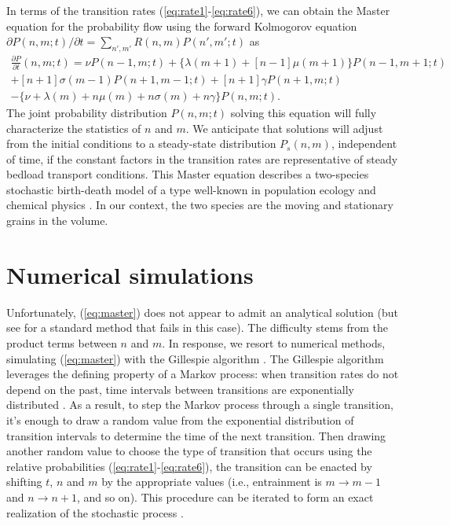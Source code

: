 \documentclass[draft]{agujournal2018}
\begin{document}
In terms of the transition rates (\ref{eq:rate1}-\ref{eq:rate6}), we can obtain the Master equation for the probability flow using the forward Kolmogorov equation $\partial P(n,m;t)/\partial t = 
\sum_{n',m'} R(n,m)P(n',m';t)$ \citep[e.g.][]{Cox1965, Gillespie1992, Ancey2008} as 
\begin{multline}
 \frac{\partial P}{\partial t}(n,m;t) =  
\nu P(n-1,m;t) + 
\{\lambda(m+1) + [n-1]\mu(m+1)\}P(n-1,m+1;t)\\ + 
[n+1]\sigma(m-1)P(n+1,m-1;t) + 
[n+1]\gamma P(n+1,m;t) \\- 
\{ \nu + \lambda(m) + n\mu(m) + n\sigma(m) + n \gamma \}P(n,m;t).
 \label{eq:master}
\end{multline}
The joint probability distribution $P(n,m;t)$ solving this equation will fully characterize the statistics of $n$ and $m$.
We anticipate that solutions will adjust from the initial conditions to a steady-state distribution $P_s(n,m)$, independent of time, if the constant factors in the transition rates are representative of steady bedload transport conditions.
This Master equation describes a two-species stochastic birth-death model \citep[e.g.][]{Cox1965} of a type well-known in population ecology \citep[e.g.][]{Pielou1977, Swift2002} and chemical physics \citep[e.g.][]{Gardiner1983}.
In our context, the two species are the moving and stationary grains in the volume.

\section{Numerical simulations}

Unfortunately, (\ref{eq:master}) does not appear to admit an analytical solution (but see \citet{Swift2002} for a standard method that fails in this case).
The difficulty stems from the product terms between $n$ and $m$.
In response, we resort to numerical methods, simulating (\ref{eq:master}) with the Gillespie algorithm \citep{Gillespie1977, Gillespie1992, Gillespie2007}.
The Gillespie algorithm leverages the defining property of a Markov process: when transition rates do not depend on the past, time intervals between transitions are exponentially distributed \citep[e.g.][]{Cox1965}.
As a result, to step the Markov process through a single transition, it's enough to draw a random value from the exponential distribution of transition intervals to determine the time of the next transition.
Then drawing another random value to choose the type of transition that occurs using the relative probabilities (\ref{eq:rate1}-\ref{eq:rate6}), the transition can be enacted by shifting $t$, $n$ and $m$ by the appropriate values (i.e., entrainment is $m\rightarrow m-1$ and $n \rightarrow n+1$, and so on).
This procedure can be iterated to form an exact realization of the stochastic process \citep[e.g.][]{Gillespie2007}.
\end{document}
